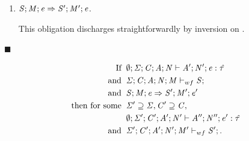 \begin{bproof}
\begin{bcase}[\dregparsteptask{}]
\begin{enumerate}
By the well-formedness of the task set given in the premise of this lemma,
we establish the well-formedness of stores of all tasks in the task set $\TASKSET$,
and we obtain the result $\storewf{\SENV}{\CENV}{\AENV}{\NENV}{\TASKSET}{\STOR}{\MENV}$,
thus discharging this obligation.

\item $\mathit{S};\mathit{M};\mathit{e} \Rightarrow \mathit{S}';\mathit{M}';\mathit{e}$.

This obligation discharges straightforwardly by inversion on \dregparsteptask{}.

\end{enumerate}

\end{bcase}

$\blacksquare$

\end{bproof}


\begin{lemma}
  \label{lemma:single-thread-preservation}
  \begin{displaymath}
    \begin{aligned}
      \text{If} \;\; & \emptyset;\mathit{\Sigma};\mathit{C};\mathit{A};\mathit{N} \vdash \mathit{A}';\mathit{N}';\mathit{e} : \mathit{\hat{\tau}} \\
      \text{and} \;\; & \mathit{\Sigma};\mathit{C};\mathit{A};\mathit{N};\mathit{M} \vdash_{wf} \mathit{S};\\
      \text{and} \;\; & \mathit{S};\mathit{M};\mathit{e} \Rightarrow \mathit{S}';\mathit{M}';\mathit{e}' \\
      \text{then for some} \;\; & \mathit{\Sigma}' \supseteq \mathit{\Sigma}, \mathit{C}' \supseteq \mathit{C} ,\\
      & \emptyset;\mathit{\Sigma}';\mathit{C}';\mathit{A}';\mathit{N}' \vdash \mathit{A}'';\mathit{N}'';\mathit{e}' : \mathit{\hat{\tau}} \\
      \text{and} \;\; & \mathit{\Sigma}';\mathit{C}';\mathit{A}';\mathit{N}';\mathit{M}' \vdash_{wf} \mathit{S}';.
    \end{aligned}
  \end{displaymath}
\end{lemma}


